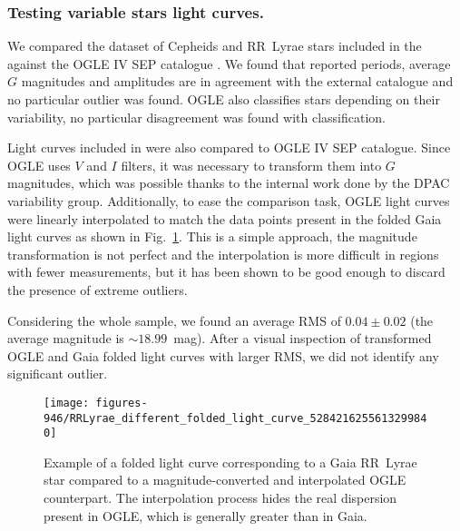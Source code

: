 \subsubsection{Testing variable stars light curves.}\label{chap:cu9val_var_lc}

We compared the dataset of Cepheids and RR~Lyrae stars included in the {} against the OGLE IV SEP catalogue \citep{2012AcA....62..219S}. We found that reported {} periods, average $G$ magnitudes and amplitudes are in agreement with the external catalogue and no particular outlier was found. OGLE also classifies stars depending on their variability, no particular disagreement was found with {} classification.

Light curves included in {} were also compared to OGLE IV SEP catalogue. Since OGLE uses $V$ and $I$ filters, it was necessary to transform them into $G$ magnitudes, which was possible thanks to the internal work done by the DPAC variability group. Additionally, to ease the comparison task, OGLE light curves were linearly interpolated to match the data points present in the folded Gaia light curves as shown in Fig.~\ref{fig:946_folded_cepheid}. This is a simple approach, the magnitude transformation is not perfect and the interpolation is more difficult in regions with fewer measurements, but it has been shown to be good enough to discard the presence of extreme outliers. 

Considering the whole sample, we found an average RMS of $0.04\pm0.02$ (the average {\gmag} magnitude is $\sim18.99$~mag). After a visual inspection of transformed OGLE and Gaia folded light curves with larger RMS, we did not identify any significant outlier.

\begin{figure}
\centering
\texttt{[image: figures-946/RRLyrae\_different\_folded\_light\_curve\_5284216255613299840]}
\caption{Example of a folded light curve corresponding to a Gaia RR~Lyrae star compared to a magnitude-converted and interpolated OGLE counterpart. The interpolation process hides the real dispersion present in OGLE, which is generally greater than in Gaia.}\label{fig:946_folded_cepheid}
\end{figure}


